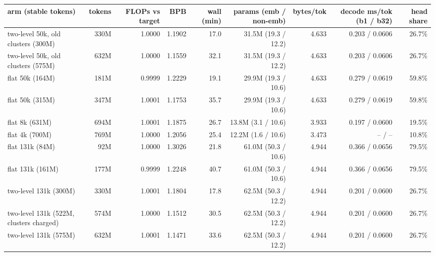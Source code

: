 \begin{tabular}{lrrrrrrrr}
\toprule
arm (stable tokens) & tokens & FLOPs vs target & BPB & wall (min) & params (emb / non-emb) & bytes/tok & decode ms/tok (b1 / b32) & head share \\
\midrule
two-level 50k, old clusters (300M) & 330M & 1.0000 & 1.1902 & 17.0 & 31.5M (19.3 / 12.2) & 4.633 & 0.203 / 0.0606 & 26.7\% \\
two-level 50k, old clusters (575M) & 632M & 1.0000 & 1.1559 & 32.1 & 31.5M (19.3 / 12.2) & 4.633 & 0.203 / 0.0606 & 26.7\% \\
flat 50k (164M) & 181M & 0.9999 & 1.2229 & 19.1 & 29.9M (19.3 / 10.6) & 4.633 & 0.279 / 0.0619 & 59.8\% \\
flat 50k (315M) & 347M & 1.0001 & 1.1753 & 35.7 & 29.9M (19.3 / 10.6) & 4.633 & 0.279 / 0.0619 & 59.8\% \\
flat 8k (631M) & 694M & 1.0001 & 1.1875 & 26.7 & 13.8M (3.1 / 10.6) & 3.933 & 0.197 / 0.0600 & 19.5\% \\
flat 4k (700M) & 769M & 1.0000 & 1.2056 & 25.4 & 12.2M (1.6 / 10.6) & 3.473 & -- / -- & 10.8\% \\
flat 131k (84M) & 92M & 1.0000 & 1.3026 & 21.8 & 61.0M (50.3 / 10.6) & 4.944 & 0.366 / 0.0656 & 79.5\% \\
flat 131k (161M) & 177M & 0.9999 & 1.2248 & 40.7 & 61.0M (50.3 / 10.6) & 4.944 & 0.366 / 0.0656 & 79.5\% \\
two-level 131k (300M) & 330M & 1.0001 & 1.1804 & 17.8 & 62.5M (50.3 / 12.2) & 4.944 & 0.201 / 0.0600 & 26.7\% \\
two-level 131k (522M, clusters charged) & 574M & 1.0000 & 1.1512 & 30.5 & 62.5M (50.3 / 12.2) & 4.944 & 0.201 / 0.0600 & 26.7\% \\
two-level 131k (575M) & 632M & 1.0001 & 1.1471 & 33.6 & 62.5M (50.3 / 12.2) & 4.944 & 0.201 / 0.0600 & 26.7\% \\
\bottomrule
\end{tabular}
